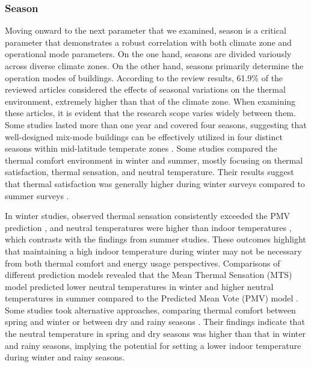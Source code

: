 \documentclass[final,3p,times,12pt]{elsarticle}
\begin{document}
\subsubsection{Season}

Moving onward to the next parameter that we examined, season is a critical parameter that demonstrates a robust correlation with both climate zone and operational mode parameters. On the one hand, seasons are divided variously across diverse climate zones. On the other hand, seasons primarily determine the operation modes of buildings. According to the review results, 61.9\% of the reviewed articles considered the effects of seasonal variations on the thermal environment, extremely higher than that of the climate zone. When examining these articles, it is evident that the research scope varies widely between them. Some studies lasted more than one year and covered four seasons, suggesting that well-designed mix-mode buildings can be effectively utilized in four distinct seasons within mid-latitude temperate zones \cite{jiaThermalComfortMixedmode2020}. Some studies compared the thermal comfort environment in winter and summer, mostly focusing on thermal satisfaction, thermal sensation, and neutral temperature. Their results suggest that thermal satisfaction was generally higher during winter surveys compared to summer surveys \cite{wagnerThermalComfortWorkplace2007}. 

In winter studies, observed thermal sensation consistently exceeded the PMV prediction \cite{caoFieldStudyHuman2011}, and neutral temperatures were higher than indoor temperatures \cite{yanThermalAdaptiveModels2017,yangResidentialThermalEnvironment2013a}, which contrasts with the findings from summer studies.
These outcomes highlight that maintaining a high indoor temperature during winter may not be necessary from both thermal comfort and energy usage perspectives. 
Comparisons of different prediction models revealed that the Mean Thermal Sensation (MTS) model predicted lower neutral temperatures in winter and higher neutral temperatures in summer compared to the Predicted Mean Vote (PMV) model \cite{yanThermalAdaptiveModels2017}.
Some studies took alternative approaches, comparing thermal comfort between spring and winter \cite{wangThermalAdaptationThermal2014} or between dry and rainy seasons \cite{akandeIndoorThermalComfort}.
Their findings indicate that the neutral temperature in spring and dry seasons was higher than that in winter and rainy seasons, implying the potential for setting a lower indoor temperature during winter and rainy seasons.
\end{document}
